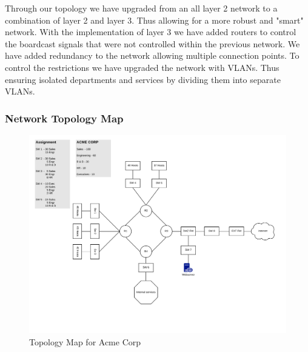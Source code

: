 Through our topology we have upgraded from an all layer 2 network to a 
combination of layer 2 and layer 3. Thus allowing for a more robust and "smart" 
network. With the implementation of layer 3 we have added routers to control 
the boardcast signals that were not controlled within the previous network. We
have added redundancy to the network allowing multiple connection points. To 
control the restrictions we have upgraded the network with VLANs. Thus ensuring
isolated departments and services by dividing them into separate VLANs. 
 
\subsubsection{Network Topology Map}
\begin{figure}[!htb]
	\includegraphics[width=\textwidth]{images/networktopology.png}
	\caption{Topology Map for Acme Corp}
\end{figure}
